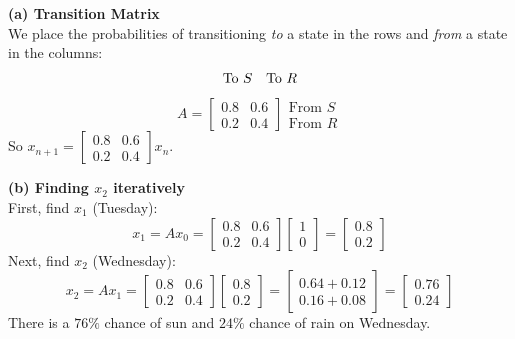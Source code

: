 \begin{solution}
\textbf{(a) Transition Matrix} \\
We place the probabilities of transitioning \emph{to} a state in the rows and \emph{from} a state in the columns:
\[
\text{To } S \quad \text{To } R \\
\]
\[
A = \begin{bmatrix} 0.8 & 0.6 \\ 0.2 & 0.4 \end{bmatrix} \begin{matrix} \text{From } S \\ \text{From } R \end{matrix}
\]
So $x_{n+1} = \begin{bmatrix} 0.8 & 0.6 \\ 0.2 & 0.4 \end{bmatrix} x_n$.

\medskip
\textbf{(b) Finding $x_2$ iteratively} \\
First, find $x_1$ (Tuesday):
\[
x_1 = A x_0 = \begin{bmatrix} 0.8 & 0.6 \\ 0.2 & 0.4 \end{bmatrix} \begin{bmatrix} 1 \\ 0 \end{bmatrix} = \begin{bmatrix} 0.8 \\ 0.2 \end{bmatrix}
\]
Next, find $x_2$ (Wednesday):
\[
x_2 = A x_1 = \begin{bmatrix} 0.8 & 0.6 \\ 0.2 & 0.4 \end{bmatrix} \begin{bmatrix} 0.8 \\ 0.2 \end{bmatrix} = \begin{bmatrix} 0.64 + 0.12 \\ 0.16 + 0.08 \end{bmatrix} = \begin{bmatrix} 0.76 \\ 0.24 \end{bmatrix}
\]
There is a $76\%$ chance of sun and $24\%$ chance of rain on Wednesday.


\end{solution}
